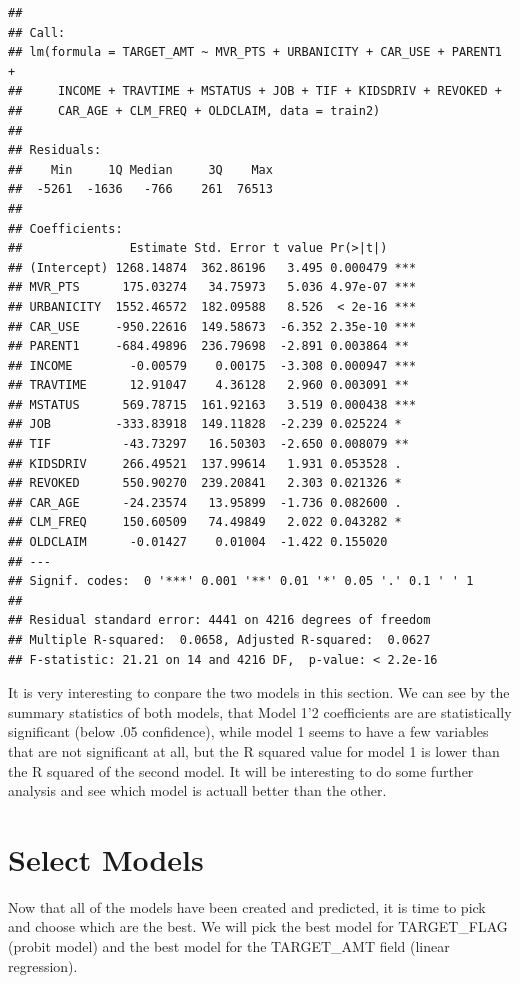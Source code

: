 \documentclass[]{article}
\begin{document}
\begin{verbatim}
## 
## Call:
## lm(formula = TARGET_AMT ~ MVR_PTS + URBANICITY + CAR_USE + PARENT1 + 
##     INCOME + TRAVTIME + MSTATUS + JOB + TIF + KIDSDRIV + REVOKED + 
##     CAR_AGE + CLM_FREQ + OLDCLAIM, data = train2)
## 
## Residuals:
##    Min     1Q Median     3Q    Max 
##  -5261  -1636   -766    261  76513 
## 
## Coefficients:
##               Estimate Std. Error t value Pr(>|t|)    
## (Intercept) 1268.14874  362.86196   3.495 0.000479 ***
## MVR_PTS      175.03274   34.75973   5.036 4.97e-07 ***
## URBANICITY  1552.46572  182.09588   8.526  < 2e-16 ***
## CAR_USE     -950.22616  149.58673  -6.352 2.35e-10 ***
## PARENT1     -684.49896  236.79698  -2.891 0.003864 ** 
## INCOME        -0.00579    0.00175  -3.308 0.000947 ***
## TRAVTIME      12.91047    4.36128   2.960 0.003091 ** 
## MSTATUS      569.78715  161.92163   3.519 0.000438 ***
## JOB         -333.83918  149.11828  -2.239 0.025224 *  
## TIF          -43.73297   16.50303  -2.650 0.008079 ** 
## KIDSDRIV     266.49521  137.99614   1.931 0.053528 .  
## REVOKED      550.90270  239.20841   2.303 0.021326 *  
## CAR_AGE      -24.23574   13.95899  -1.736 0.082600 .  
## CLM_FREQ     150.60509   74.49849   2.022 0.043282 *  
## OLDCLAIM      -0.01427    0.01004  -1.422 0.155020    
## ---
## Signif. codes:  0 '***' 0.001 '**' 0.01 '*' 0.05 '.' 0.1 ' ' 1
## 
## Residual standard error: 4441 on 4216 degrees of freedom
## Multiple R-squared:  0.0658, Adjusted R-squared:  0.0627 
## F-statistic: 21.21 on 14 and 4216 DF,  p-value: < 2.2e-16
\end{verbatim}

It is very interesting to conpare the two models in this section. We can
see by the summary statistics of both models, that Model 1'2
coefficients are are statistically significant (below .05 confidence),
while model 1 seems to have a few variables that are not significant at
all, but the R squared value for model 1 is lower than the R squared of
the second model. It will be interesting to do some further analysis and
see which model is actuall better than the other.

\section{Select Models}\label{select-models}

Now that all of the models have been created and predicted, it is time
to pick and choose which are the best. We will pick the best model for
TARGET\_FLAG (probit model) and the best model for the TARGET\_AMT field
(linear regression).
\end{document}
